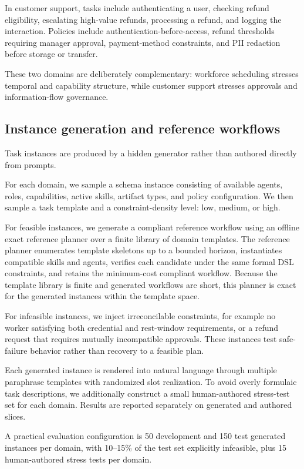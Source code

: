 \documentclass[11pt]{article}
\begin{document}
In customer support, tasks include authenticating a user, checking refund eligibility, escalating high-value refunds, processing a refund, and logging the interaction. Policies include authentication-before-access, refund thresholds requiring manager approval, payment-method constraints, and PII redaction before storage or transfer.

These two domains are deliberately complementary: workforce scheduling stresses temporal and capability structure, while customer support stresses approvals and information-flow governance.

\subsection{Instance generation and reference workflows}
Task instances are produced by a hidden generator rather than authored directly from prompts.

For each domain, we sample a schema instance consisting of available agents, roles, capabilities, active skills, artifact types, and policy configuration. We then sample a task template and a constraint-density level: low, medium, or high.

For feasible instances, we generate a compliant reference workflow using an offline exact reference planner over a finite library of domain templates. The reference planner enumerates template skeletons up to a bounded horizon, instantiates compatible skills and agents, verifies each candidate under the same formal DSL constraints, and retains the minimum-cost compliant workflow. Because the template library is finite and generated workflows are short, this planner is exact for the generated instances within the template space.

For infeasible instances, we inject irreconcilable constraints, for example no worker satisfying both credential and rest-window requirements, or a refund request that requires mutually incompatible approvals. These instances test safe-failure behavior rather than recovery to a feasible plan.

Each generated instance is rendered into natural language through multiple paraphrase templates with randomized slot realization. To avoid overly formulaic task descriptions, we additionally construct a small human-authored stress-test set for each domain. Results are reported separately on generated and authored slices.

A practical evaluation configuration is 50 development and 150 test generated instances per domain, with 10--15\% of the test set explicitly infeasible, plus 15 human-authored stress tests per domain.
\end{document}
